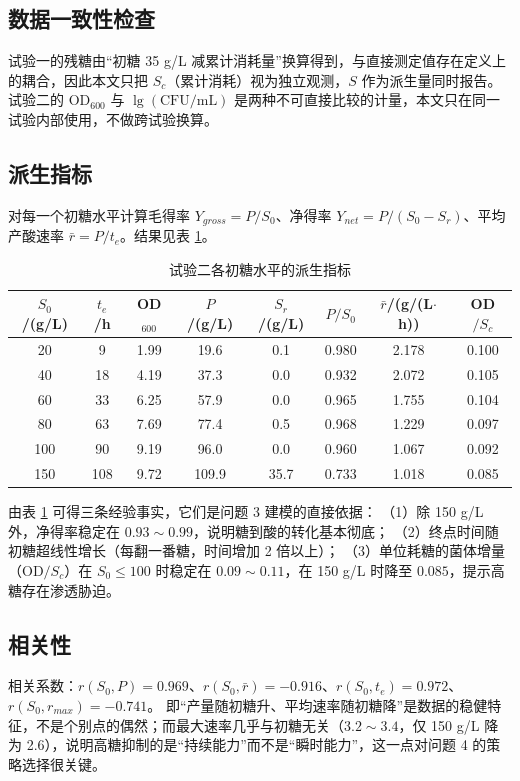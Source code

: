 \documentclass[12pt,a4paper]{ctexart}
\begin{document}
\subsection{数据一致性检查}
试验一的残糖由“初糖 35 g/L 减累计消耗量”换算得到，与直接测定值存在定义上的耦合，因此本文只把 $S_c$（累计消耗）视为独立观测，$S$ 作为派生量同时报告。
试验二的 $\mathrm{OD}_{600}$ 与 $\lg(\mathrm{CFU/mL})$ 是两种不可直接比较的计量，本文只在同一试验内部使用，不做跨试验换算。

\subsection{派生指标}
对每一个初糖水平计算毛得率 $Y_{gross}=P/S_0$、净得率 $Y_{net}=P/(S_0-S_r)$、平均产酸速率 $\bar r=P/t_e$。结果见表 \ref{tab:q3data}。

\begin{table}[H]
\centering
\caption{试验二各初糖水平的派生指标}
\label{tab:q3data}
\small
\begin{tabular}{cccccccc}
\toprule
$S_0$/(g/L) & $t_e$/h & OD$_{600}$ & $P$/(g/L) & $S_r$/(g/L) & $P/S_0$ & $\bar r$/(g/(L$\cdot$h)) & OD$/S_c$ \\
\midrule
20  & 9   & 1.99 & 19.6 & 0.1  & 0.980 & 2.178 & 0.100 \\
40  & 18  & 4.19 & 37.3 & 0.0  & 0.932 & 2.072 & 0.105 \\
60  & 33  & 6.25 & 57.9 & 0.0  & 0.965 & 1.755 & 0.104 \\
80  & 63  & 7.69 & 77.4 & 0.5  & 0.968 & 1.229 & 0.097 \\
100 & 90  & 9.19 & 96.0 & 0.0  & 0.960 & 1.067 & 0.092 \\
150 & 108 & 9.72 & 109.9 & 35.7 & 0.733 & 1.018 & 0.085 \\
\bottomrule
\end{tabular}
\end{table}

由表 \ref{tab:q3data} 可得三条经验事实，它们是问题 3 建模的直接依据：
（1）除 150 g/L 外，净得率稳定在 $0.93\sim0.99$，说明糖到酸的转化基本彻底；
（2）终点时间随初糖超线性增长（每翻一番糖，时间增加 2 倍以上）；
（3）单位耗糖的菌体增量（OD$/S_c$）在 $S_0\le100$ 时稳定在 $0.09\sim0.11$，在 150 g/L 时降至 $0.085$，提示高糖存在渗透胁迫。

\subsection{相关性}
相关系数：$r(S_0,P)=0.969$、$r(S_0,\bar r)=-0.916$、$r(S_0,t_e)=0.972$、$r(S_0,r_{max})=-0.741$。
即“产量随初糖升、平均速率随初糖降”是数据的稳健特征，不是个别点的偶然；而最大速率几乎与初糖无关（$3.2\sim3.4$，仅 150 g/L 降为 2.6），说明高糖抑制的是“持续能力”而不是“瞬时能力”，这一点对问题 4 的策略选择很关键。
\end{document}
